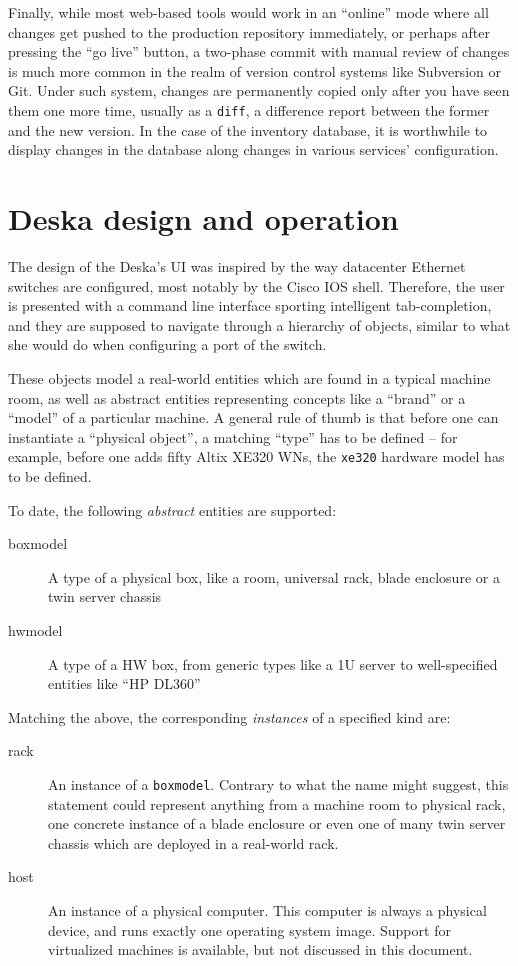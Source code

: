 \documentclass[11pt]{article}
\begin{document}
Finally, while most web-based tools would work in an ``online'' mode where all
changes get pushed to the production repository immediately, or perhaps after
pressing the ``go live'' button, a two-phase commit with manual review of
changes is much more common in the realm of version control systems like
Subversion or Git.  Under such system, changes are permanently copied only after
you have seen them one more time, usually as a {\tt diff}, a difference report
between the former and the new version.  In the case of the inventory database,
it is worthwhile to display changes in the database along changes in various
services' configuration.

\section{Deska design and operation}

The design of the Deska's UI was inspired by the way datacenter Ethernet
switches are configured, most notably by the Cisco IOS shell.  Therefore, the
user is presented with a command line interface sporting intelligent
tab-completion, and they are supposed to navigate through a hierarchy of
objects, similar to what she would do when configuring a port of the switch.

These objects model a real-world entities which are found in a typical machine
room, as well as abstract entities representing concepts like a ``brand'' or a
``model'' of a particular machine.  A general rule of thumb is that before one
can instantiate a ``physical object'', a matching ``type'' has to be defined --
for example, before one adds fifty Altix XE320 WNs, the {\tt xe320} hardware
model has to be defined.

To date, the following {\em abstract} entities are supported:

\begin{description}
    \item[boxmodel] A type of a physical box, like a room, universal rack, blade
        enclosure or a twin server chassis
    \item[hwmodel] A type of a HW box, from generic types like a 1U server to
        well-specified entities like ``HP DL360''
\end{description}

Matching the above, the corresponding {\em instances} of a specified kind are:

\begin{description}
    \item[rack] An instance of a {\tt boxmodel}.  Contrary to what the name
        might suggest, this statement could represent anything from a machine
        room to physical rack, one concrete instance of a blade enclosure or
        even one of many twin server chassis which are deployed in a real-world
        rack.
    \item[host] An instance of a physical computer.  This computer is always a
        physical device, and runs exactly one operating system image.  Support
        for virtualized machines is available, but not discussed in this
        document.
\end{description}
\end{document}
